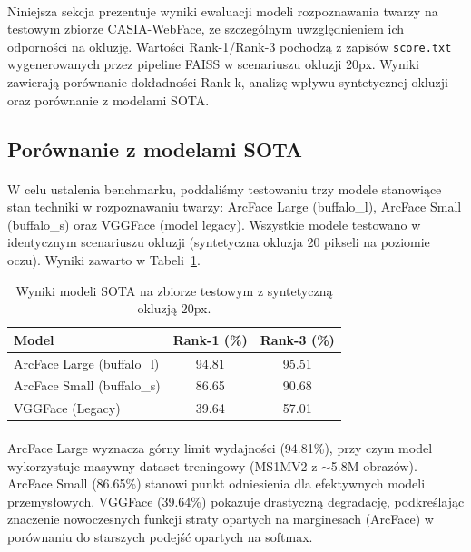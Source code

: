 \paragraph{}Niniejsza sekcja prezentuje wyniki ewaluacji modeli rozpoznawania twarzy na testowym zbiorze CASIA-WebFace, ze szczególnym uwzględnieniem ich odporności na okluzję. Wartości Rank-1/Rank-3 pochodzą z zapisów \texttt{score.txt} wygenerowanych przez pipeline FAISS w scenariuszu okluzji 20px. Wyniki zawierają porównanie dokładności Rank-k, analizę wpływu syntetycznej okluzji oraz porównanie z modelami SOTA.

\subsection{Porównanie z modelami SOTA}

\paragraph{}W celu ustalenia benchmarku, poddaliśmy testowaniu trzy modele stanowiące stan techniki w rozpoznawaniu twarzy: ArcFace Large (buffalo\_l), ArcFace Small (buffalo\_s) oraz VGGFace (model legacy). Wszystkie modele testowano w identycznym scenariuszu okluzji (syntetyczna okluzja 20 pikseli na poziomie oczu). Wyniki zawarto w Tabeli~\ref{tab:sota_baseline}.

\begin{table}[H]
\centering
\small
\begin{tabular}{lcc}
\toprule
\textbf{Model} & \textbf{Rank-1 (\%)} & \textbf{Rank-3 (\%)} \\
\midrule
ArcFace Large (buffalo\_l) & 94.81 & 95.51 \\
ArcFace Small (buffalo\_s) & 86.65 & 90.68 \\
VGGFace (Legacy) & 39.64 & 57.01 \\
\bottomrule
\end{tabular}
\caption{Wyniki modeli SOTA na zbiorze testowym z syntetyczną okluzją 20px.}
\label{tab:sota_baseline}
\end{table}

\paragraph{}ArcFace Large wyznacza górny limit wydajności (94.81\%), przy czym model wykorzystuje masywny dataset treningowy (MS1MV2 z $\sim$5.8M obrazów). ArcFace Small (86.65\%) stanowi punkt odniesienia dla efektywnych modeli przemysłowych. VGGFace (39.64\%) pokazuje drastyczną degradację, podkreślając znaczenie nowoczesnych funkcji straty opartych na marginesach (ArcFace) w porównaniu do starszych podejść opartych na softmax.


